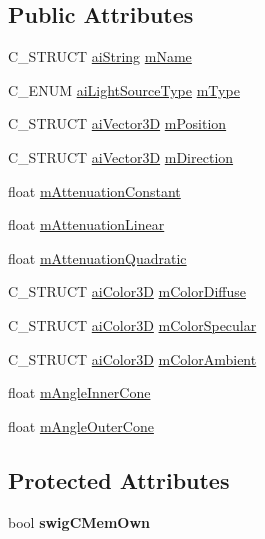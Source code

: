 \subsection*{Public Attributes}
\begin{DoxyCompactItemize}
\item 
C\+\_\+\+S\+T\+R\+U\+C\+T \hyperlink{structai_string}{ai\+String} \hyperlink{structai_light_a92806413f16230728b04e5f379fd00c0}{m\+Name}
\item 
C\+\_\+\+E\+N\+U\+M \hyperlink{light_8h_a7a75cb224d903e71e8daede432449766}{ai\+Light\+Source\+Type} \hyperlink{structai_light_a4cba1741875dd92724ff55be91c60c2b}{m\+Type}
\item 
C\+\_\+\+S\+T\+R\+U\+C\+T \hyperlink{structai_vector3_d}{ai\+Vector3\+D} \hyperlink{structai_light_a5daf9c9ad2613603b847a527123611f0}{m\+Position}
\item 
C\+\_\+\+S\+T\+R\+U\+C\+T \hyperlink{structai_vector3_d}{ai\+Vector3\+D} \hyperlink{structai_light_af3776d5e4e6065cb6dd7e10dc656dada}{m\+Direction}
\item 
float \hyperlink{structai_light_ae8804b3c309527ca0f85d676bab55710}{m\+Attenuation\+Constant}
\item 
float \hyperlink{structai_light_aefda311eaa785ea345782dfa95be817c}{m\+Attenuation\+Linear}
\item 
float \hyperlink{structai_light_ab4fb07bfa40a807661b1ed1791838a6d}{m\+Attenuation\+Quadratic}
\item 
C\+\_\+\+S\+T\+R\+U\+C\+T \hyperlink{structai_color3_d}{ai\+Color3\+D} \hyperlink{structai_light_a22e7feebbfaf53adf73bd9f581636efd}{m\+Color\+Diffuse}
\item 
C\+\_\+\+S\+T\+R\+U\+C\+T \hyperlink{structai_color3_d}{ai\+Color3\+D} \hyperlink{structai_light_aa79ae6ad6a10f0cb9c740e23b6bb01bf}{m\+Color\+Specular}
\item 
C\+\_\+\+S\+T\+R\+U\+C\+T \hyperlink{structai_color3_d}{ai\+Color3\+D} \hyperlink{structai_light_a5188b60e6fbaf1635fa780913508e3cd}{m\+Color\+Ambient}
\item 
float \hyperlink{structai_light_abad0466811938623e98bf1d334143f9a}{m\+Angle\+Inner\+Cone}
\item 
float \hyperlink{structai_light_a20fd332a5f9d8e8cb94816ff2b0ae7f4}{m\+Angle\+Outer\+Cone}
\end{DoxyCompactItemize}
\subsection*{Protected Attributes}
\begin{DoxyCompactItemize}
\item 
\hypertarget{structai_light_a4507e3fa833a1b40840bb6f20b1bfcbf}{bool {\bfseries swig\+C\+Mem\+Own}}\label{structai_light_a4507e3fa833a1b40840bb6f20b1bfcbf}

\end{DoxyCompactItemize}
